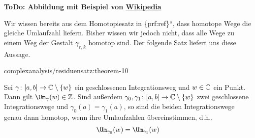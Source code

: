 \par
\textbf{ToDo: Abbildung mit Beispiel von \href{https://de.wikipedia.org/wiki/Umlaufzahl\_(Mathematik)}{Wikipedia}}

\par
Wir wissen bereits aus dem Homotopiesatz in \{prf:ref\}``, dass homotope Wege die gleiche Umlaufzahl liefern.
Bisher wissen wir jedoch nicht, dass alle Wege zu einem Weg der Gestalt \(\gamma_{r,k}\) homotop sind.
Der folgende Satz liefert uns diese Aussage.
\begin{theorem}{}{complexanalysis/residuensatz:theorem-10}



\par
Sei \(\gamma \colon [a,b] \rightarrow \mathbb{C} \setminus \{w\}\) ein geschlossenen Integrationsweg und \(w \in \mathbb{C}\) ein Punkt.
Dann gilt \(\Um_\gamma(w) \in \Z\).
Sind außerdem \(\gamma_0, \gamma_1 \colon [a,b] \rightarrow \mathbb{C} \setminus \{w\}\) zwei geschlossene Integrationswege und \(\gamma_0(a) = \gamma_1(a)\), so sind die beiden Integrationswege genau dann homotop, wenn ihre Umlaufzahlen übereinstimmen, d.h.,
\begin{align*}
\Um_{\gamma_0}(w) = \Um_{\gamma_1}(w)
\end{align*}\end{theorem}

